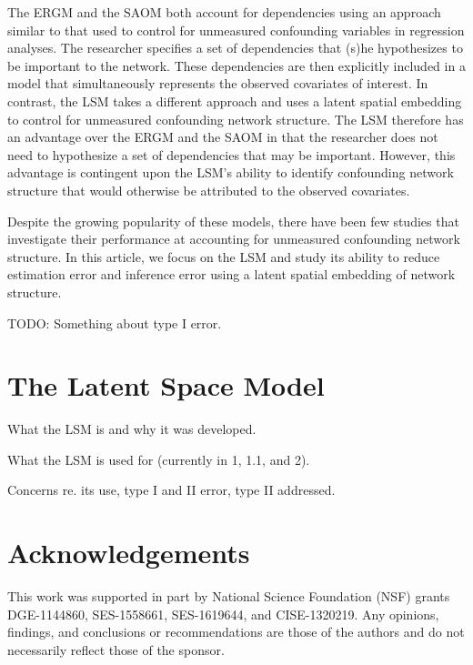 \documentclass[11pt]{article}
\begin{document}
The ERGM and the SAOM both account for dependencies using an approach
similar to that used to control for unmeasured confounding variables
in regression analyses. The researcher specifies a set of dependencies
that (s)he hypothesizes to be important to the network. These
dependencies are then explicitly included in a model that
simultaneously represents the observed covariates of interest. In
contrast, the LSM takes a different approach and uses a latent spatial
embedding to control for unmeasured confounding network structure. The
LSM therefore has an advantage over the ERGM and the SAOM in that the
researcher does not need to hypothesize a set of dependencies that may
be important. However, this advantage is contingent upon the LSM's
ability to identify confounding network structure that would otherwise
be attributed to the observed covariates.

Despite the growing popularity of these models, there have been few
studies that investigate their performance at accounting for
unmeasured confounding network structure. In this article, we focus on
the LSM and study its ability to reduce estimation error and inference
error using a latent spatial embedding of network structure.


TODO: Something about type I error.

\section{The Latent Space Model}

What the LSM is and why it was developed.

What the LSM is used for (currently in 1, 1.1, and 2).

Concerns re. its use, type I and II error, type II addressed.

\section{}


\section*{Acknowledgements}

This work was supported in part by National Science Foundation (NSF)
grants DGE-1144860, SES-1558661, SES-1619644, and CISE-1320219. Any
opinions, findings, and conclusions or recommendations are those of
the authors and do not necessarily reflect those of the sponsor.


\end{document}
